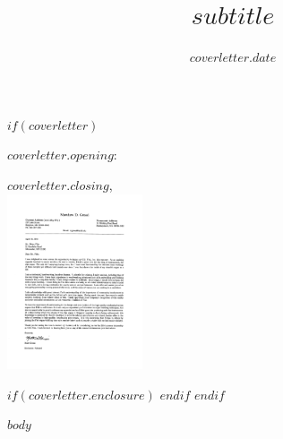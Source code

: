 \documentclass[letterpaper,10pt,final]{moderncv}
\title{$subtitle$}
\begin{document}
$if(coverletter)$
\date{$coverletter.date$}
\opening{$coverletter.opening$:}
\closing{$coverletter.closing$,\\ \includegraphics[width=4cm]{_images/signature} \vspace{-1cm}}
$if(coverletter.enclosure)$
$endif$
$endif$

\makelettertitle

$body$

\makeletterclosing
\end{document}
